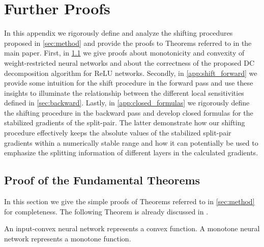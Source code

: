 \section{Further Proofs}

In this appendix we rigorously define and analyze the shifting procedures proposed in \cref{sec:method} and provide the proofs to Theorems referred to in the main paper. First, in \cref{app:fundamental} we give proofs about monotonicity and convexity of weight-restricted neural networks and about the correctness of the proposed DC decomposition algorithm for ReLU networks.
Secondly, in \cref{app:shift_forward} we provide some intuition for the shift procedure in the forward pass and use these insights to illuminate the relationship between the different local sensitivities defined in \cref{sec:backward}.
Lastly, in \cref{app:closed_formulas} we rigorously define the shifting procedure in the backward pass and develop closed formulas for the stabilized gradients of the split-pair. The latter demonstrate how our shifting procedure effectively keeps the absolute values of the stabilized split-pair gradients within a numerically stable range and how it can potentially be used to emphasize the splitting information of different layers in the calculated gradients.

\subsection{Proof of the Fundamental Theorems} \label{app:fundamental}

In this section we give the simple proofs of Theorems referred to in \cref{sec:method} for completeness.
The following Theorem is already discussed in .
\begin{theorem} \label{thm:convexity_monotonicity}
    An input-convex neural network represents a convex function. A monotone neural network represents a monotone function.
\end{theorem}

